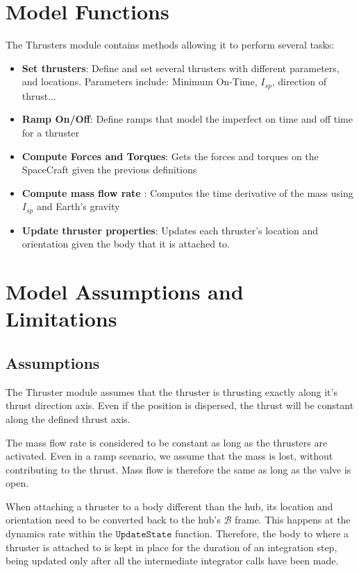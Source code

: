 \section{Model Functions}

The Thrusters module contains methods allowing it to perform several tasks:

\begin{itemize}
	\item \textbf{Set thrusters}: Define and set several thrusters with different parameters, and locations. Parameters include: Minimum On-Time, $I_{sp}$, direction of thrust...
	\item \textbf{Ramp On/Off}: Define ramps that model the imperfect on time and off time for a thruster
	\item \textbf{Compute Forces and Torques}: Gets the forces and torques on the SpaceCraft given the previous definitions
	\item \textbf{Compute mass flow rate }: Computes the time derivative of the mass using $I_{sp}$ and Earth's gravity
	\item \textbf{Update thruster properties}: Updates each thruster's location and orientation given the body that it is attached to.
\end{itemize}




\section{Model Assumptions and Limitations}

\subsection{Assumptions}

The Thruster module assumes that the thruster is thrusting exactly along it's thrust direction axis. Even if the position is dispersed, the thrust will be constant along the defined thrust axis.

The mass flow rate is considered to be constant as long as the thrusters are activated. Even in a ramp scenario, we assume that the mass is lost, without contributing to the thrust. Mass flow is therefore the same as long as the valve is open.

When attaching a thruster to a body different than the hub, its location and orientation need to be converted back to the hub's $\mathcal{B}$ frame. This happens at the dynamics rate within the $\texttt{UpdateState}$ function. Therefore, the body to where a thruster is attached to is kept in place for the duration of an integration step, being updated only after all the intermediate integrator calls have been made.


